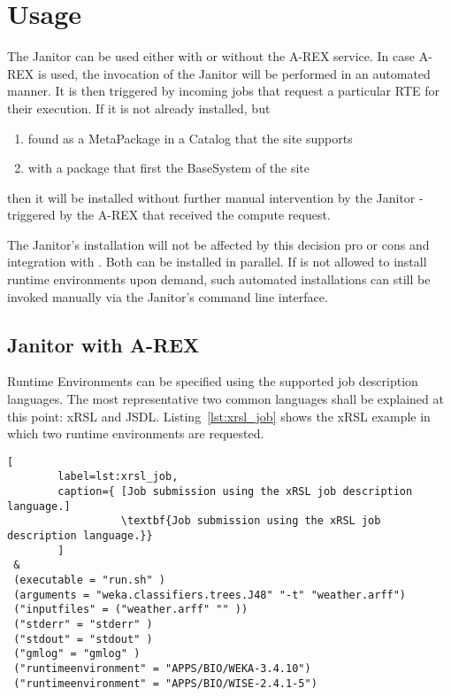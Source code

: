 \chapter{Usage}

The Janitor can be used either with or without the A-REX service.
In case
A-REX is used, the invocation of the Janitor will be performed in an
automated manner.  It is then triggered by incoming jobs that request
a particular RTE for their execution.  If it is not already installed,
but
\begin{enumerate}
\item found as a MetaPackage in a Catalog that the site supports
\item with a package that first the BaseSystem of the site
\end{enumerate}
then it will be installed without further manual intervention by the
Janitor - triggered by the A-REX that received the compute request.

The Janitor's installation will not be affected by this decision
pro or cons and integration with \AREX. Both can be installed in
parallel. If \AREX is not allowed to install runtime environments upon
demand, such automated installations can still be invoked manually via
the Janitor's command line  interface.

\section{Janitor with A-REX}

Runtime Environments can be specified using the supported job description
languages.  The most representative two common languages shall be
explained at this point: xRSL and JSDL.  Listing~\ref{lst:xrsl_job}
shows the xRSL example in which two runtime environments are requested.

\begin{lstlisting}[
        label=lst:xrsl_job,
        caption={ [Job submission using the xRSL job description language.]
                  \textbf{Job submission using the xRSL job description language.}}
        ]
 &
 (executable = "run.sh" )
 (arguments = "weka.classifiers.trees.J48" "-t" "weather.arff")
 ("inputfiles" = ("weather.arff" "" ))
 ("stderr" = "stderr" )
 ("stdout" = "stdout" )
 ("gmlog" = "gmlog" )
 ("runtimeenvironment" = "APPS/BIO/WEKA-3.4.10")
 ("runtimeenvironment" = "APPS/BIO/WISE-2.4.1-5")
\end{lstlisting}

